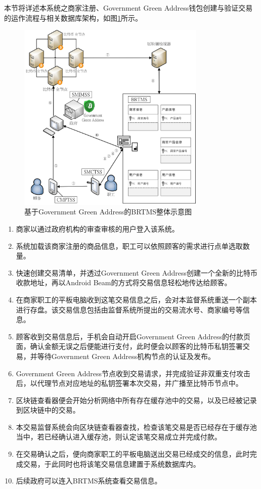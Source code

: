 本节将详述本系统之商家注册、Government Green Address钱包创建与验证交易的运作流程与相关数据库架构，如图\ref{gabpcss}所示。

	\begin{figure}[!htbp]
		\centering
		\includegraphics[width = 0.8\textwidth]{gabpcss.jpg}
		\caption{基于Government Green Address的BRTMS整体示意图}\label{gabpcss}
	\end{figure}

	\begin{enumerate}
		\item 商家以通过政府机构的审查审核的用户登入该系统。
		\item 系统加载该商家注册的商品信息，职工可以依照顾客的需求进行点单选取数量。
		\item 快速创建交易清单，并透过Government Green Address创建一个全新的比特币收款地址，再以Android Beam的方式将交易信息轻松地传达给顾客。
		\item 在商家职工的平板电脑收到这笔交易信息之后，会对本监督系统重送一个副本进行存盘。该交易信息包括由监督系统所提出的交易流水号、商家编号等信息。
		\item 顾客收到交易信息后，手机会自动开启Government Green Address的付款页面，确认金额无误之后便能进行支付，此时便会以顾客的比特币私钥签署交易，并等待Government Green Address机构节点的认证及发布。
		\item Government Green Address节点收到交易请求，并完成验证非双重支付攻击后，以代理节点对应地址的私钥签署本次交易，并广播至比特币节点中。
		\item 区块链查看器便会开始分析网络中所有存在缓存池中的交易，以及已经被记录到区块链中的交易。
		\item 本交易监督系统会向区块链查看器查找，检查该笔交易是否已经存在于缓存池当中，若已经确认进入缓存池，则认定该笔交易成立并完成付款。
		\item 在交易确认之后，便向商家职工的平板电脑送出交易已经成交的信息，此时完成交易，于此同时也将该笔交易信息建置于系统数据库内。
		\item 后续政府可以连入BRTMS系统查看交易信息。
	\end{enumerate}